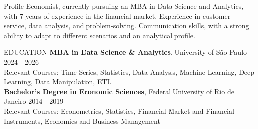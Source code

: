 \documentclass{resume}
\begin{document}
\begin{rSection}{Profile}
{Economist, currently pursuing an MBA in Data Science and Analytics, with 7 years of experience in the financial market. Experience in customer service, data analysis, and problem-solving. Communication skills, with a strong ability to adapt to different scenarios and an analytical profile.}
\end{rSection}
\begin{rSection}{EDUCATION}
{\bf MBA in Data Science \& Analytics}, University of São Paulo \hfill {2024 - 2026}\\
{\footnotesize Relevant Courses: Time Series, Statistics, Data Analysis, Machine Learning, Deep Learning, Data Manipulation, ETL} \\

\vspace{-1.25em}
{\bf Bachelor's Degree in Economic Sciences}, Federal University of Rio de Janeiro \hfill {2014 - 2019} \\
\footnotesize{Relevant Courses: Econometrics, Statistics, Financial Market and Financial Instruments, Economics and Business Management} 
\end{rSection}
\end{document}
